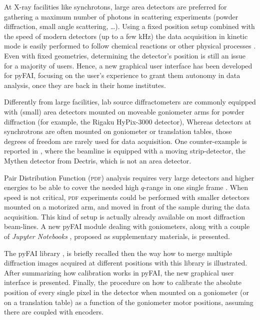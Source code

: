 \documentclass[preprint, pdf]{iucr}              %
\begin{document}
At X-ray facilities like synchrotons, large area detectors are 
preferred for gathering a maximum number of photons in
scattering experiments (powder diffraction, small angle
scattering, \ldots).
Using a fixed position setup combined with the speed of modern detectors (up
to a few kHz) the data acquisition in kinetic mode is easily performed to 
follow chemical reactions or other physical processes \cite{id15, id31}.
Even with fixed geometries, determining the detector's position is
still an issue for a majority of users. 
Hence, a new graphical user interface has been developed for pyFAI, focusing
on the user's experience to grant them autonomy in data analysis, once they
are back in their home institutes.

Differently from large facilities, lab source diffractometers
are commonly equipped with (small) area detectors mounted on moveable goniometer
arms for powder diffraction (for example, the Rigaku HyPix-3000 detector),
Whereas detectors at synchrotrons are often mounted on goniometer or
translation tables, those degrees of freedom are rarely used for data
acquisition.
One counter-example is reported in \cite{Gao:kc5032}, where the beamline
is equipped with a moving strip-detector, the Mythen detector from Dectris,
which is not an area detector.




Pair Distribution Function (\textsc{pdf}) analysis requires very large
detectors and higher energies to be able to cover the needed high $q$-range in
one single frame \cite{Chupas:wf5000}.
When speed is not critical, \textsc{pdf} experiments could be performed
with smaller detectors mounted on a motorized arm, and moved in front of
the sample during the data acquisition. 
This kind of setup is actually already available on most diffraction
beam-lines. 
A new pyFAI module dealing with goniometers, along with
a couple of \textit{Jupyter Notebooks}
\cite{ipython}, proposed as supplementary materials, is presented.

The pyFAI library \cite{fv5028}, is briefly recalled then the way how to
merge multiple diffraction images acquired at different positions with this
library \cite{PyFAI_PDJ} is illustrated. 
After summarizing how calibration works in pyFAI, the new graphical user
interface is presented.
Finally, the procedure on how to calibrate the absolute position of
every single pixel in the detector when mounted on a goniometer (or on a
translation table) as a function of the goniometer motor positions, assuming
there are coupled with encoders. 
\end{document}
